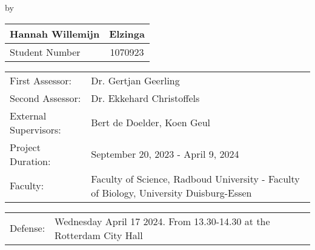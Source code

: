 \begin{titlepage}

\begin{center}

{\makeatletter
\largetitlestyle\fontsize{45}{45}\selectfont\@title
\makeatother}

{\makeatletter
\ifdefvoid{\@subtitle}{}{\bigskip\titlestyle\fontsize{20}{20}\selectfont\@subtitle}
\makeatother}

\bigskip
\bigskip

by

\bigskip
\bigskip

{\makeatletter
\largetitlestyle\fontsize{25}{25}\selectfont\@author
\makeatother}

\bigskip
\bigskip

\setlength\extrarowheight{2pt}
\begin{tabular}{lc}
    Hannah Willemijn &Elzinga \\\midrule
    Student Number & 1070923 \\
\end{tabular}

\vfill

\begin{tabular}{ll}
    First Assessor: & Dr. Gertjan Geerling\\
    Second Assessor: & Dr. Ekkehard Christoffels \\
    External Supervisors: & Bert de Doelder, Koen Geul\\
    Project Duration: & September 20, 2023 - April 9, 2024\\
    Faculty: & Faculty of Science, Radboud University - Faculty of Biology, University Duisburg-Essen \\
\end{tabular}

\bigskip
\bigskip


\begin{tabular}{ll}
    Defense:& Wednesday April 17 2024. From 13.30-14.30 at the Rotterdam City Hall
\end{tabular}
\end{center}
\end{titlepage}




